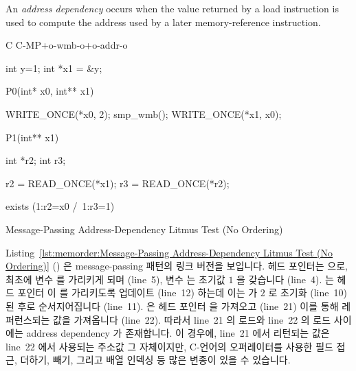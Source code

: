 An \emph{address dependency} occurs when the value returned by a load
instruction is used to compute the address used by a later memory-reference
instruction.
\fi

\begin{listing}[tbp]
{ \scriptsize
\begin{verbbox}[\LstLineNo]
C C-MP+o-wmb-o+o-addr-o

{
int y=1;
int *x1 = &y;
}

P0(int* x0, int** x1) {

  WRITE_ONCE(*x0, 2);
  smp_wmb();
  WRITE_ONCE(*x1, x0);

}

P1(int** x1) {

  int *r2;
  int r3;

  r2 = READ_ONCE(*x1);
  r3 = READ_ONCE(*r2);

}

exists (1:r2=x0 /\ 1:r3=1)
\end{verbbox}
}
\centering
\theverbbox
\caption{Message-Passing Address-Dependency Litmus Test (No Ordering)}
\label{lst:memorder:Message-Passing Address-Dependency Litmus Test (No Ordering)}
\end{listing}

Listing~\ref{lst:memorder:Message-Passing Address-Dependency Litmus Test (No Ordering)}
()
은 message-passing 패턴의 링크 버전을 보입니다.
헤드 포인터는  으로, 최초에  변수  를 가리키게 되며
(line~5), 변수  는 초기값 $1$ 을 갖습니다 (line~4).
 는 헤드 포인터  이  를 가리키도록 업데이트 (line~12)
하는데 이는  가 $2$ 로 초기화 (line~10) 된 후로 순서지어집니다
(line~11).
 은 헤드 포인터  을 가져오고 (line~21) 이를 통해 레퍼런스되는
값을 가져옵니다 (line~22).
따라서 line~21 의 로드와 line~22 의 로드 사이에는 address dependency 가
존재합니다.
이 경우에, line~21 에서 리턴되는 값은 line~22 에서 사용되는 주소값 그
자체이지만, C-언어의 \co{->} 오퍼레이터를 사용한 필드 접근, 더하기, 빼기,
그리고 배열 인덱싱 등 많은 변종이 있을 수 있습니다.

